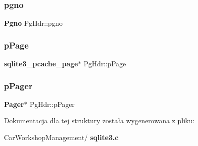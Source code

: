 \mbox{\label{struct_pg_hdr_ab6e2223e410acf9bae7f12f1b1293589}} 
\subsubsection{pgno}
{\footnotesize\ttfamily \textbf{ Pgno} Pg\+Hdr\+::pgno}

\mbox{\label{struct_pg_hdr_aa5645976ba0634993a7304dce8856c8b}} 
\subsubsection{pPage}
{\footnotesize\ttfamily \textbf{ sqlite3\+\_\+pcache\+\_\+page}$\ast$ Pg\+Hdr\+::p\+Page}

\mbox{\label{struct_pg_hdr_aaa4879a9510c8a819a1e10a8ee21495b}} 
\subsubsection{pPager}
{\footnotesize\ttfamily \textbf{ Pager}$\ast$ Pg\+Hdr\+::p\+Pager}



Dokumentacja dla tej struktury została wygenerowana z pliku\+:\begin{DoxyCompactItemize}
\item 
Car\+Workshop\+Management/\textbf{ sqlite3.\+c}\end{DoxyCompactItemize}
